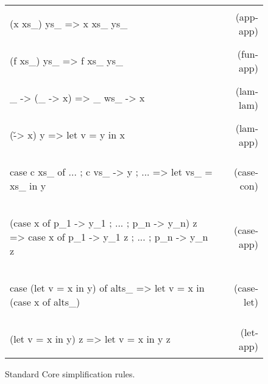 \documentclass[preprint]{sigplanconf}
\newcommand{\simp}[2]{\vspace{-7mm} #2 & (#1) \\}
\newenvironment{simplify}
    {\noindent
     \begin{flushright}
     \begin{tabular}{p{6.5cm}r}
    }
    {\end{tabular}
     \vspace{-7mm}
     \end{flushright}
    }
\begin{document}
\begin{figure}
\begin{simplify}

\simp{app-app}{
\begin{code}
(x xs_) ys_
    => x xs_ ys_
\end{code}}

\simp{fun-app}{
\begin{code}
(f xs_) ys_
    => f xs_ ys_
\end{code}}

\simp{lam-lam}{
\begin{code}
\vs_ -> (\ws_ -> x)
    => \vs_ ws_ -> x
\end{code}}

\simp{lam-app}{
\begin{code}
(\v -> x) y
    => let v = y in x
\end{code}}

\simp{case-con}{
\begin{code}
case c xs_ of {... ; c vs_ -> y ; ...}
    => let vs_ = xs_ in y
\end{code}}

\simp{case-app}{
\begin{code}
(case x of {p_1 -> y_1 ; ... ; p_n -> y_n}) z
    => case x of {p_1 -> y_1 z ; ... ; p_n -> y_n z}
\end{code}}

\simp{case-let}{
\begin{code}
case (let v = x in y) of alts_
    => let v = x in (case x of alts_)
\end{code}}

\simp{let-app}{
\begin{code}
(let v = x in y) z
    => let v = x in y z
\end{code}}

\end{simplify}
\caption{Standard Core simplification rules.}
\label{fig:simplify}
\end{figure}
\end{document}
